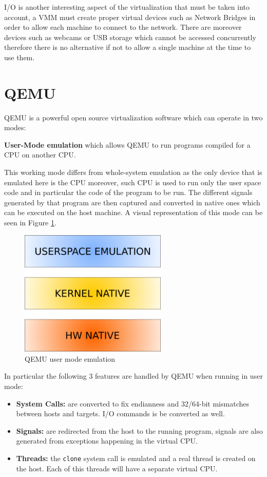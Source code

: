I/O is another interesting aspect of the virtualization that must be taken into account, a VMM must create proper virtual devices such as Network Bridges in order to allow each machine to connect to the network. There are moreover devices such as webcams or USB storage which cannot be accessed concurrently therefore there is no alternative if not to allow a single machine at the time to use them.


\section{QEMU}

QEMU is a powerful open source virtualization software which can operate in two modes: 

\textbf{User-Mode emulation} which allows QEMU to run programs compiled for a CPU on another CPU.

This working mode differs from whole-system emulation as the only device that is emulated here is the CPU moreover, such CPU is used to run only the user space code and in particular the code of the program to be run. The different signals generated by that program are then captured and converted in native ones which can be executed on the host machine. A visual representation of this mode can be seen in Figure \ref{fig:quser}.

\begin{figure}[htp]
\centering
\includegraphics[width=7cm]{images/qemu-user.png}
\caption{QEMU user mode emulation\cite{quser}}
\label{fig:quser}
\end{figure}

In particular the following 3 features are handled by QEMU when running in user mode:

\begin{itemize}
    \item \textbf{System Calls:} are converted to fix endianness and 32/64-bit mismatches between hosts and targets. I/O commands is be converted as well.
    \item \textbf{Signals:} are redirected from the host to the running program, signals are also generated from exceptions happening in the virtual CPU.
    \item \textbf{Threads:} the \lstinline{clone} system call is emulated and a real thread is created on the host. Each of this threads will have a separate virtual CPU.
\end{itemize}

